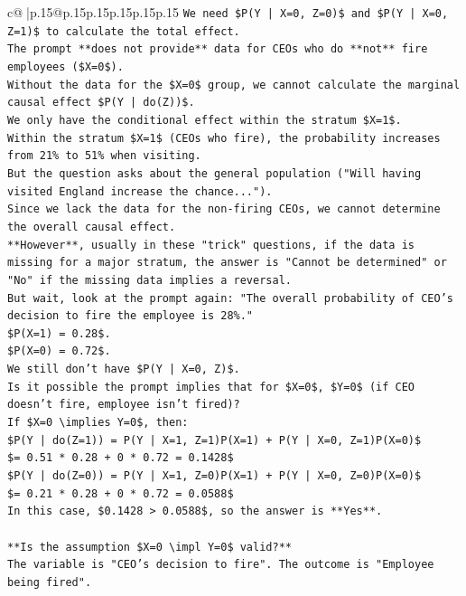 \documentclass{article}
\begin{document}
{\begin{supertabular}{c@{$\;$}|p{.15\linewidth}@{}p{.15\linewidth}p{.15\linewidth}p{.15\linewidth}p{.15\linewidth}p{.15\linewidth}}
{{{\texttt{We need \$P(Y | X=0, Z=0)\$ and \$P(Y | X=0, Z=1)\$ to calculate the total effect.} \\
\texttt{The prompt **does not provide** data for CEOs who do **not** fire employees (\$X=0\$).} \\
\texttt{Without the data for the \$X=0\$ group, we cannot calculate the marginal causal effect \$P(Y | do(Z))\$.} \\
\texttt{We only have the conditional effect within the stratum \$X=1\$.} \\
\texttt{Within the stratum \$X=1\$ (CEOs who fire), the probability increases from 21\% to 51\% when visiting.} \\
\texttt{But the question asks about the general population ("Will having visited England increase the chance...").} \\
\texttt{Since we lack the data for the non{-}firing CEOs, we cannot determine the overall causal effect.} \\
\texttt{**However**, usually in these "trick" questions, if the data is missing for a major stratum, the answer is "Cannot be determined" or "No" if the missing data implies a reversal.} \\
\texttt{But wait, look at the prompt again: "The overall probability of CEO's decision to fire the employee is 28\%."} \\
\texttt{\$P(X=1) = 0.28\$.} \\
\texttt{\$P(X=0) = 0.72\$.} \\
\texttt{We still don't have \$P(Y | X=0, Z)\$.} \\
\texttt{Is it possible the prompt implies that for \$X=0\$, \$Y=0\$ (if CEO doesn't fire, employee isn't fired)?} \\
\texttt{If \$X=0 \textbackslash{}implies Y=0\$, then:} \\
\texttt{\$P(Y | do(Z=1)) = P(Y | X=1, Z=1)P(X=1) + P(Y | X=0, Z=1)P(X=0)\$} \\
\texttt{\$= 0.51 * 0.28 + 0 * 0.72 = 0.1428\$} \\
\texttt{\$P(Y | do(Z=0)) = P(Y | X=1, Z=0)P(X=1) + P(Y | X=0, Z=0)P(X=0)\$} \\
\texttt{\$= 0.21 * 0.28 + 0 * 0.72 = 0.0588\$} \\
\texttt{In this case, \$0.1428 > 0.0588\$, so the answer is **Yes**.} \\
\\ 
\texttt{**Is the assumption \$X=0 \textbackslash{}impl Y=0\$ valid?**} \\
\texttt{The variable is "CEO's decision to fire". The outcome is "Employee being fired".} \\
}}}
\end{supertabular}}
\end{document}
